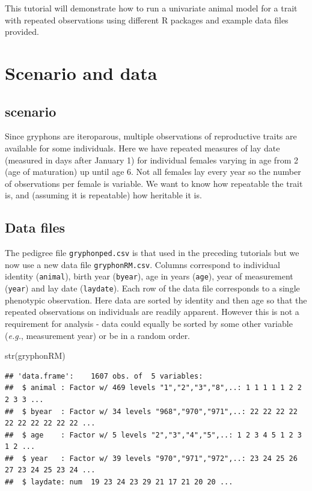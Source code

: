 \documentclass[
  12pt,
]{book}
\newenvironment{Shaded}{\begin{snugshade}}{\end{snugshade}}
\newcommand{\FunctionTok}[1]{\textcolor[rgb]{0.00,0.00,0.00}{#1}}
\newcommand{\NormalTok}[1]{#1}
\begin{document}
This tutorial will demonstrate how to run a univariate animal model for a trait with repeated observations using different R packages and example data files provided.

\hypertarget{scenario-and-data-2}{%
\section{Scenario and data}\label{scenario-and-data-2}}

\hypertarget{scenario-2}{%
\subsection{scenario}\label{scenario-2}}

Since gryphons are iteroparous, multiple observations of reproductive traits are available for some individuals. Here we have repeated measures of lay date (measured in days after January 1) for individual females varying in age from 2 (age of maturation) up until age 6. Not all females lay every year so the number of observations per female is variable. We want to know how repeatable the trait is, and (assuming it is repeatable) how heritable it is.

\hypertarget{data-files-2}{%
\subsection{Data files}\label{data-files-2}}

The pedigree file \texttt{gryphonped.csv} is that used in the preceding tutorials but we now use a new data file \texttt{gryphonRM.csv}. Columns correspond to individual identity (\texttt{animal}), birth year (\texttt{byear}), age in years (\texttt{age}), year of measurement (\texttt{year}) and lay date (\texttt{laydate}). Each row of the data file corresponds to a single phenotypic observation. Here data are sorted by identity and then age so that the repeated observations on individuals are readily apparent. However this is not a requirement for analysis - data could equally be sorted by some other variable (\emph{e.g.}, measurement year) or be in a random order.

\begin{Shaded}
\begin{Highlighting}[]
\FunctionTok{str}\NormalTok{(gryphonRM)}
\end{Highlighting}
\end{Shaded}

\begin{verbatim}
## 'data.frame':    1607 obs. of  5 variables:
##  $ animal : Factor w/ 469 levels "1","2","3","8",..: 1 1 1 1 1 2 2 2 3 3 ...
##  $ byear  : Factor w/ 34 levels "968","970","971",..: 22 22 22 22 22 22 22 22 22 22 ...
##  $ age    : Factor w/ 5 levels "2","3","4","5",..: 1 2 3 4 5 1 2 3 1 2 ...
##  $ year   : Factor w/ 39 levels "970","971","972",..: 23 24 25 26 27 23 24 25 23 24 ...
##  $ laydate: num  19 23 24 23 29 21 17 21 20 20 ...
\end{verbatim}
\end{document}
